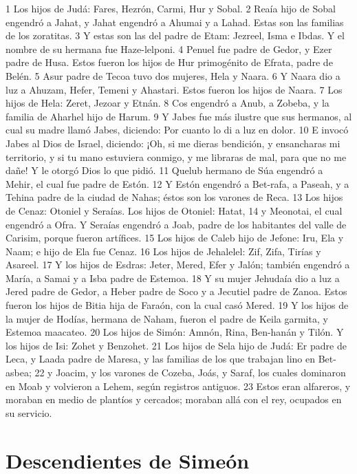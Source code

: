 1 Los hijos de Judá: Fares, Hezrón, Carmi, Hur y Sobal.
2 Reaía hijo de Sobal engendró a Jahat, y Jahat engendró a Ahumai y a Lahad. Estas son las familias de los zoratitas.
3 Y estas son las del padre de Etam: Jezreel, Isma e Ibdas. Y el nombre de su hermana fue Haze-lelponi.
4 Penuel fue padre de Gedor, y Ezer padre de Husa. Estos fueron los hijos de Hur primogénito de Efrata, padre de Belén.
5 Asur padre de Tecoa tuvo dos mujeres, Hela y Naara.
6 Y Naara dio a luz a Ahuzam, Hefer, Temeni y Ahastari. Estos fueron los hijos de Naara.
7 Los hijos de Hela: Zeret, Jezoar y Etnán.
8 Cos engendró a Anub, a Zobeba, y la familia de Aharhel hijo de Harum.
9 Y Jabes fue más ilustre que sus hermanos, al cual su madre llamó Jabes, diciendo: Por cuanto lo di a luz en dolor.
10 E invocó Jabes al Dios de Israel, diciendo: ¡Oh, si me dieras bendición, y ensancharas mi territorio, y si tu mano estuviera conmigo, y me libraras de mal, para que no me dañe! Y le otorgó Dios lo que pidió.
11 Quelub hermano de Súa engendró a Mehir, el cual fue padre de Estón.
12 Y Estón engendró a Bet-rafa, a Paseah, y a Tehina padre de la ciudad de Nahas; éstos son los varones de Reca.
13 Los hijos de Cenaz: Otoniel y Seraías. Los hijos de Otoniel: Hatat,
14 y Meonotai, el cual engendró a Ofra. Y Seraías engendró a Joab, padre de los habitantes del valle de Carisim, porque fueron artífices.
15 Los hijos de Caleb hijo de Jefone: Iru, Ela y Naam; e hijo de Ela fue Cenaz.
16 Los hijos de Jehalelel: Zif, Zifa, Tirías y Asareel.
17 Y los hijos de Esdras: Jeter, Mered, Efer y Jalón; también engendró a María, a Samai y a Isba padre de Estemoa.
18 Y su mujer Jehudaía dio a luz a Jered padre de Gedor, a Heber padre de Soco y a Jecutiel padre de Zanoa. Estos fueron los hijos de Bitia hija de Faraón, con la cual casó Mered.
19 Y los hijos de la mujer de Hodías, hermana de Naham, fueron el padre de Keila garmita, y Estemoa maacateo.
20 Los hijos de Simón: Amnón, Rina, Ben-hanán y Tilón. Y los hijos de Isi: Zohet y Benzohet.
21 Los hijos de Sela hijo de Judá: Er padre de Leca, y Laada padre de Maresa, y las familias de los que trabajan lino en Bet- asbea;
22 y Joacim, y los varones de Cozeba, Joás, y Saraf, los cuales dominaron en Moab y volvieron a Lehem, según registros antiguos.
23 Estos eran alfareros, y moraban en medio de plantíos y cercados; moraban allá con el rey, ocupados en su servicio.
\section*{Descendientes de Simeón}

